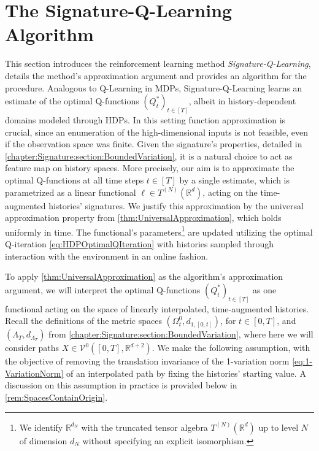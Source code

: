 \documentclass[
    a4paper,
    11pt,
    bibliography=totoc,
    listof=totoc,      
    headinclude=true,
    cleardoublepage=empty,
]{scrbook}
\theoremstyle{plain}
\theoremstyle{definition}
\theoremstyle{remark}
\newcommand{\SetR}{\mathbb R}
\begin{document}
\section{The Signature-Q-Learning Algorithm}
\label{chapter:SignatureQLearning:section:Algorithm}

This section introduces the reinforcement learning method 
\textit{Signature-Q-Learning}, details the method's approximation argument and provides 
an algorithm for the procedure. Analogous to Q-Learning in MDPs, 
Signature-Q-Learning learns an estimate of the optimal Q-functions 
$(Q_t^*)_{t\in[T]}$, albeit in history-dependent domains modeled through 
HDPs. In this setting function approximation is crucial, since an enumeration 
of the high-dimensional inputs is not feasible, even if the observation space 
was finite. Given the signature's properties, detailed in 
\cref{chapter:Signature:section:BoundedVariation}, it is a natural 
choice to act as feature map on history spaces. More precisely, our aim is to 
approximate the optimal Q-functions at all time steps $t\in[T]$ by a single 
estimate, which is parametrized as a linear functional $\ell\in T^{(N)}
(\SetR^d)$, acting on the time-augmented histories' signatures. We justify this approximation by the universal 
approximation property from \cref{thm:UniversalApproximation}, which holds 
uniformly in time. The functional's parameters\footnote{
    We identify $\SetR^{d_N}$ with the truncated tensor algebra 
    $T^{(N)}(\SetR^d)$ up to level $N$ of dimension $d_N$ without specifying an explicit isomorphism.
}  
are updated utilizing the optimal Q-iteration \eqref{eq:HDPOptimalQIteration} 
with histories sampled through interaction with the environment in an online 
fashion. 

To apply \cref{thm:UniversalApproximation} as the algorithm's approximation 
argument, we will interpret the optimal Q-functions $(Q_t^*)_{t\in[T]}$ as one 
functional acting on the space of linearly interpolated, time-augmented 
histories. Recall the definitions of the metric spaces $(\Omega_t^0, 
d_{1,[0,t]})$, for $t\in[0,T]$, and $(\Lambda_T, d_{\Lambda_T})$ from 
\cref{chapter:Signature:section:BoundedVariation}, where here we will consider 
paths $X\in\mathcal{V}^0([0,T],\SetR^{d+2})$.  We make the following 
assumption, with the objective of removing the translation invariance of the 
1-variation norm \eqref{eq:1-VariationNorm} of an interpolated path by fixing 
the histories' starting value. A discussion on this assumption in 
practice is provided below in \cref{rem:SpacesContainOrigin}.
\end{document}
